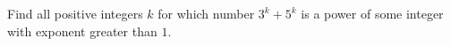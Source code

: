 Find all positive integers $k$ for which number $3^k+5^k$ is a power of some integer with exponent greater than $1$.